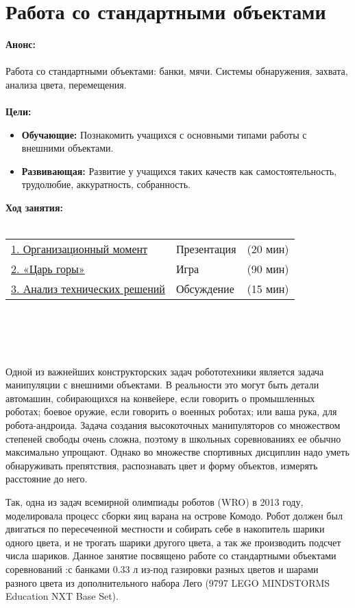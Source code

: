 \chapter{Работа со стандартными объектами}
{\bfseries Анонс:}\\\\
Работа со стандартными объектами: банки, мячи. Системы обнаружения, захвата, анализа цвета, перемещения.\\\\
{\bfseries Цели:}
\begin{itemize}
	\item{}{\bfseries Обучающие:} Познакомить учащихся с основными типами работы с внешними объектами. 
	\item{}{\bfseries Развивающая:} Развитие у учащихся таких качеств как самостоятельность, трудолюбие, аккуратность, собранность.\\
\end{itemize}	
{\bfseries Ход занятия:}\\\\
\begin{tabular}[h!]{lll}
	{\hyperlink{lesson21x1}{1. Организационный момент}}&{Презентация}&{(20 мин)}\\
	{\hyperlink{lesson21x2}{2. «Царь горы»}}&{Игра}&{(90 мин)}\\
	{\hyperlink{lesson21x3}{3. Анализ технических решений}}&{Обсуждение}&{(15 мин)}\\
\end{tabular}\\\\

{\hypertarget{lesson21x1}{}}\\\\

Одной из важнейших конструкторских задач робототехники является задача манипуляции с внешними объектами. В реальности это могут быть детали автомашин, собирающихся на конвейере, если говорить о промышленных роботах; боевое оружие, если говорить о военных роботах; или ваша рука, для робота-андроида. Задача создания высокоточных манипуляторов со множеством степеней свободы очень сложна, поэтому в школьных соревнованиях ее обычно максимально упрощают. Однако во множестве спортивных дисциплин надо уметь обнаруживать препятствия, распознавать цвет и форму объектов, измерять расстояние до него. 

Так,  одна из задач всемирной олимпиады роботов (WRO) в 2013 году, моделировала процесс сборки яиц варана на острове Комодо. Робот должен был двигаться по пересеченной местности и собирать себе в накопитель шарики одного цвета, и не трогать шарики другого цвета, а так же производить подсчет числа шариков.
Данное занятие посвящено работе со стандартными объектами соревнований :с банками 0.33 л из-под газировки разных цветов и шарами разного цвета из дополнительного набора Лего (9797 LEGO MINDSTORMS Education NXT Base Set).\\\\

